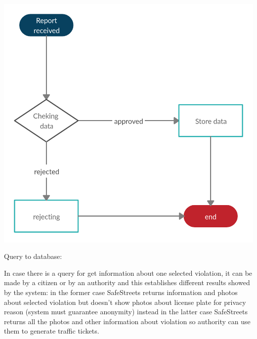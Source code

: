 \documentclass[a4paper, hidelinks, 12pt]{report}
\begin{document}
    \begin{center}
        \includegraphics[scale = 0.35]{assets/report.jpg}\\[1.6 cm]
    \end{center}

	    Query to database:

    	In case there is a query for get information about one selected violation, it can be made by a citizen or by an authority and this establishes different results showed by the system: in the former case SafeStreets returns information and photos about selected violation but doesn’t show photos about license plate for privacy reason (system must guarantee anonymity) instead in the latter case SafeStreets returns all the photos and other information about violation so authority can use them to generate traffic tickets.
\end{document}
